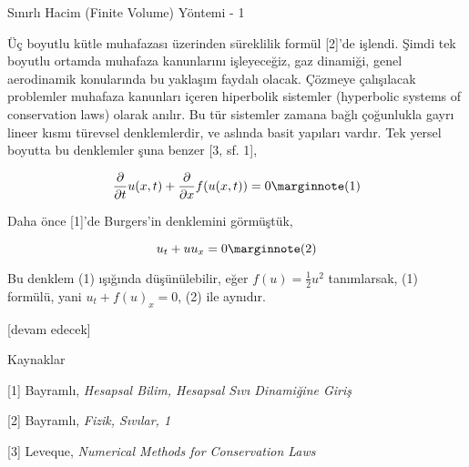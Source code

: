 \documentclass[12pt,fleqn]{article}\usepackage{../../common}
\begin{document}
Sınırlı Hacim (Finite Volume) Yöntemi - 1

Üç boyutlu kütle muhafazası üzerinden süreklilik formül [2]'de işlendi.  Şimdi
tek boyutlu ortamda muhafaza kanunlarını işleyeceğiz, gaz dinamiği, genel
aerodinamik konularında bu yaklaşım faydalı olacak. Çözmeye çalışılacak
problemler muhafaza kanunları içeren hiperbolik sistemler (hyperbolic systems of
conservation laws) olarak anılır. Bu tür sistemler zamana bağlı çoğunlukla gayrı
lineer kısmı türevsel denklemlerdir, ve aslında basit yapıları vardır. Tek
yersel boyutta bu denklemler şuna benzer [3, sf. 1],

$$
\frac{\partial }{\partial t} u(x,t) + 
\frac{\partial }{\partial x} f(u(x,t)) = 0
\mlabel{1}
$$

Daha önce [1]'de Burgers'in denklemini görmüştük, 

$$
u_t + uu_x = 0
\mlabel{2}
$$

Bu denklem (1) ışığında düşünülebilir, eğer $f(u) = \frac{1}{2}u^2$ tanımlarsak,
(1) formülü, yani $u_t + f(u)_x = 0$, (2) ile aynıdır.



[devam edecek]

Kaynaklar

[1] Bayramlı, {\em Hesapsal Bilim, Hesapsal Sıvı Dinamiğine Giriş}

[2] Bayramlı, {\em Fizik, Sıvılar, 1}

[3] Leveque, {\em Numerical Methods for Conservation Laws}
\end{document}
